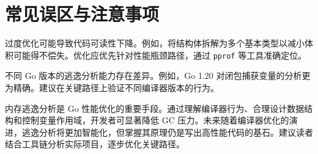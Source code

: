 \chapter{常见误区与注意事项}
过度优化可能导致代码可读性下降。例如，将结构体拆解为多个基本类型以减小体积可能得不偿失。优化应优先针对性能瓶颈路径，通过 \verb!pprof! 等工具准确定位。\par
不同 Go 版本的逃逸分析能力存在差异。例如，Go 1.20 对闭包捕获变量的分析更为精确。建议在关键路径上验证不同编译器版本的行为。\par
内存逃逸分析是 Go 性能优化的重要手段。通过理解编译器行为、合理设计数据结构和控制变量作用域，开发者可显著降低 GC 压力。未来随着编译器优化的演进，逃逸分析将更加智能化，但掌握其原理仍是写出高性能代码的基石。建议读者结合工具链分析实际项目，逐步优化关键路径。\par
